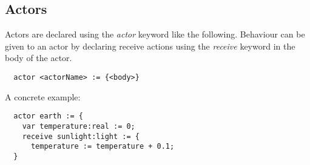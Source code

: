 \subsection{Actors}
\label{sub:actors}

Actors are declared using the \emph{actor} keyword like the following. Behaviour can be given to an actor by declaring receive actions using the \emph{receive} keyword in the body of the actor.

\begin{verbatim}
  actor <actorName> := {<body>}
\end{verbatim}

A concrete example:

\begin{verbatim}
  actor earth := {
    var temperature:real := 0;
    receive sunlight:light := {
      temperature := temperature + 0.1;
  }
\end{verbatim}